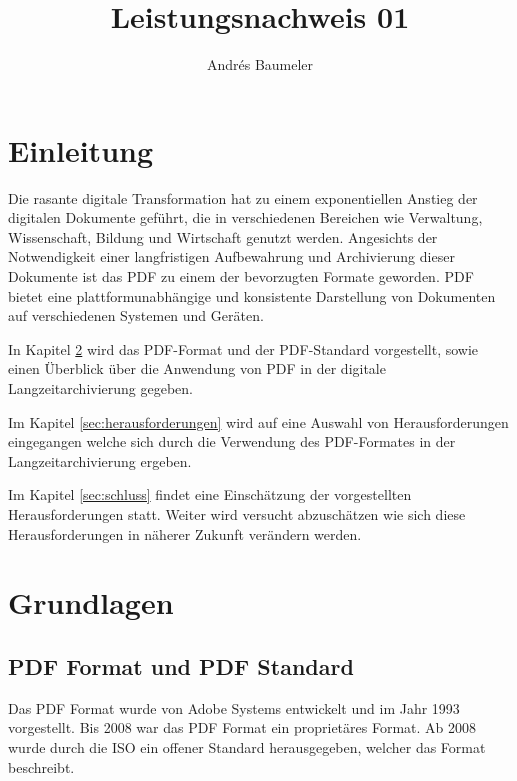 \documentclass[a4paper,oneside, 12pt]{report}
\title{Leistungsnachweis 01}
\author{Andrés Baumeler}
\begin{document}

\pagestyle{empty} %





\cleardoublepage
\tableofcontents %
\cleardoublepage %

\pagestyle{plain} %



\chapter{Einleitung}\label{sec:motivation}
Die rasante digitale Transformation hat zu einem exponentiellen Anstieg der digitalen Dokumente geführt, die in verschiedenen Bereichen wie Verwaltung, Wissenschaft, Bildung und Wirtschaft genutzt werden. Angesichts der Notwendigkeit einer langfristigen Aufbewahrung und Archivierung dieser Dokumente ist das \ac{PDF} zu einem der bevorzugten Formate geworden. \ac{PDF} bietet eine plattformunabhängige und konsistente Darstellung von Dokumenten auf verschiedenen Systemen und Geräten.

In Kapitel \ref{sec:grundlagen} wird das \ac{PDF}-Format und der \ac{PDF}-Standard vorgestellt, sowie einen Überblick über die Anwendung von \ac{PDF} in der digitale Langzeitarchivierung gegeben. 

Im Kapitel \ref{sec:herausforderungen} wird auf eine Auswahl von Herausforderungen eingegangen welche sich durch die Verwendung des \ac{PDF}-Formates in der Langzeitarchivierung ergeben.

Im Kapitel \ref{sec:schluss} findet eine Einschätzung der vorgestellten Herausforderungen statt. Weiter wird versucht abzuschätzen wie sich diese Herausforderungen in näherer Zukunft verändern werden.




\chapter{Grundlagen}\label{sec:grundlagen}
\section{PDF Format und PDF Standard}
Das PDF Format wurde von Adobe Systems entwickelt und im Jahr 1993 vorgestellt. Bis 2008 war das PDF Format ein proprietäres Format. Ab 2008 wurde durch die \ac{ISO} ein offener Standard herausgegeben, welcher das Format beschreibt. \cite{pdfhist}
\end{document}
